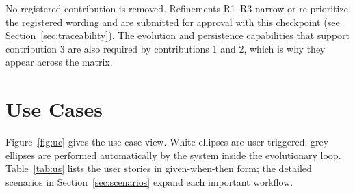 \documentclass[12pt,a4paper]{article}
\begin{document}
No registered contribution is removed. Refinements R1--R3 narrow or re-prioritize the registered wording and are submitted for approval with this checkpoint (see Section~\ref{sec:traceability}). The evolution and persistence capabilities that support contribution 3 are also required by contributions 1 and 2, which is why they appear across the matrix.

\section{Use Cases}
\label{sec:usecases}

Figure~\ref{fig:uc} gives the use-case view. White ellipses are user-triggered; grey ellipses are performed automatically by the system inside the evolutionary loop. Table~\ref{tab:us} lists the user stories in given-when-then form; the detailed scenarios in Section~\ref{sec:scenarios} expand each important workflow.
\end{document}
